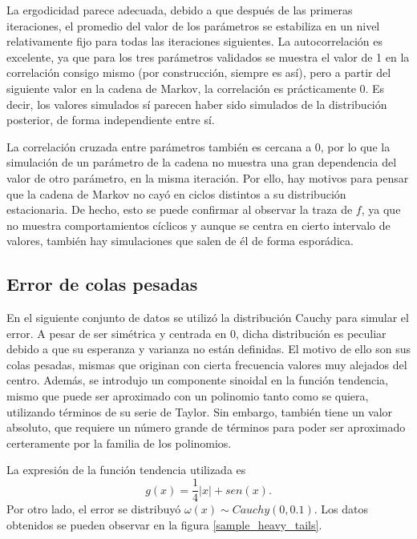 La ergodicidad parece adecuada, debido a que después de las primeras iteraciones, el promedio del valor de los par\'ametros se estabiliza en un nivel relativamente fijo para todas las iteraciones siguientes. La autocorrelaci\'on es excelente, ya que para los tres par\'ametros validados se muestra el valor de 1 en la correlaci\'on consigo mismo (por construcci\'on, siempre es as\'i), pero a partir del siguiente valor en la cadena de Markov, la correlaci\'on es pr\'acticamente 0. Es decir, los valores simulados s\'i parecen haber sido simulados de la distribuci\'on posterior, de forma independiente entre s\'i.

La correlaci\'on cruzada entre par\'ametros tambi\'en es cercana a 0, por lo que la simulaci\'on de un par\'ametro de la cadena no muestra una gran dependencia del valor de otro par\'ametro, en la misma iteraci\'on. Por ello, hay motivos para pensar que la cadena de Markov no cay\'o en ciclos distintos a su distribuci\'on estacionaria. De hecho, esto se puede confirmar al observar la traza de $f$, ya que no muestra comportamientos c\'iclicos y aunque se centra en cierto intervalo de valores, tambi\'en hay simulaciones que salen de \'el de forma espor\'adica.

\subsection{Error de colas pesadas}

En el siguiente conjunto de datos se utiliz\'o la distribuci\'on Cauchy para simular el error. A pesar de ser sim\'etrica y centrada en 0, dicha distribuci\'on es peculiar debido a que su esperanza y varianza no est\'an definidas. El motivo de ello son sus colas pesadas, mismas que originan con cierta frecuencia valores muy alejados del centro. Adem\'as, se introdujo un componente sinoidal en la funci\'on tendencia, mismo que puede ser aproximado con un polinomio tanto como se quiera, utilizando t\'erminos de su serie de Taylor. Sin embargo, tambi\'en tiene un valor absoluto, que requiere un n\'umero grande de t\'erminos para poder ser aproximado certeramente por la familia de los polinomios.

La expresi\'on de la funci\'on tendencia utilizada es \begin{equation*}
    g(x) = \frac{1}{4}|x| + sen(x).
\end{equation*}
Por otro lado, el error se distribuy\'o $\omega(x) \sim Cauchy(0,0.1)$. Los datos obtenidos se pueden observar en la figura \ref{sample_heavy_tails}.

